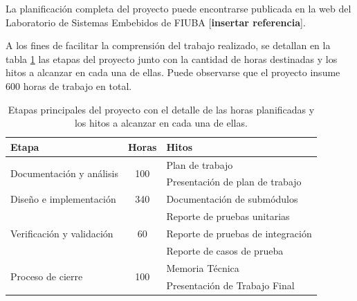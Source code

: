 La planificación completa del proyecto puede encontrarse publicada en la web del Laboratorio de Sistemas Embebidos de FIUBA [\textbf{insertar referencia}].

A los fines de facilitar la comprensión del trabajo realizado, se detallan en la tabla \ref{tab:planificacion} las etapas del proyecto junto con la cantidad de horas destinadas y los hitos a alcanzar en cada una de ellas.  Puede observarse que el proyecto insume 600 horas de trabajo en total.


\begin{table}[ht]
	\centering
	\caption[Diagrama \textit{Etapas del proyecto}.]{Etapas principales del proyecto con el detalle de las horas planificadas y los hitos a alcanzar en cada una de ellas.}
	\begin{tabular}{l c l}    
		\toprule
		\textbf{Etapa}       & \textbf{Horas}  & \textbf{Hitos}\\
		\midrule
		\multirow{2}{*}{Documentación y análisis}  & \multirow{2}{*}{100}  & Plan de trabajo\\
                                                          &                       & Presentación de plan de trabajo\\
    \hline
		Diseño e implementación                               & 340                   & Documentación de submódulos \\
   \hline
		\multirow{3}{*}{Verificación y validación}            & \multirow{3}{*}{60}   & Reporte de pruebas unitarias \\
		                                                                            & & Reporte de pruebas de integración \\
                                                                                & & Reporte de casos de prueba \\ 
   \hline
		 \multirow{2}{*}{Proceso de cierre}                 & \multirow{2}{*}{100}		& Memoria Técnica \\
		& & Presentación de Trabajo Final\\
		\bottomrule
		\hline
	\end{tabular}
	\label{tab:planificacion}
\end{table}


